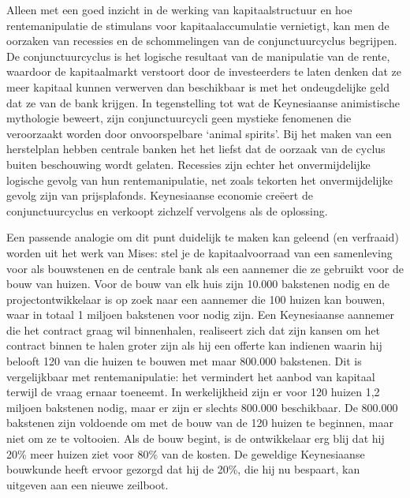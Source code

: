 Alleen met een goed inzicht in de werking van kapitaalstructuur en hoe rentemanipulatie de stimulans voor kapitaalaccumulatie vernietigt, kan men de oorzaken van recessies en de schommelingen van de conjunctuurcyclus begrijpen. De conjunctuurcyclus is het logische resultaat van de manipulatie van de rente, waardoor de kapitaalmarkt verstoort door de investeerders te laten denken dat ze meer kapitaal kunnen verwerven dan beschikbaar is met het ondeugdelijke geld dat ze van de bank krijgen. In tegenstelling tot wat de Keynesiaanse animistische mythologie beweert, zijn conjunctuurcycli geen mystieke fenomenen die veroorzaakt worden door onvoorspelbare `animal spirits'. Bij het maken van een herstelplan hebben centrale banken het het liefst dat de oorzaak van de cyclus buiten beschouwing wordt gelaten. Recessies zijn echter het onvermijdelijke logische gevolg van hun rentemanipulatie, net zoals tekorten het onvermijdelijke gevolg zijn van prijsplafonds. Keynesiaanse economie creëert de conjunctuurcyclus en verkoopt zichzelf vervolgens als de oplossing.

Een passende analogie om dit punt duidelijk te maken kan geleend (en verfraaid) worden uit het werk van Mises: stel je de kapitaalvoorraad van een samenleving voor als bouwstenen en de centrale bank als een aannemer die ze gebruikt voor de bouw van huizen. Voor de bouw van elk huis zijn 10.000 bakstenen nodig en de projectontwikkelaar is op zoek naar een aannemer die 100 huizen kan bouwen, waar in totaal 1 miljoen bakstenen voor nodig zijn. Een Keynesiaanse aannemer die het contract graag wil binnenhalen, realiseert zich dat zijn kansen om het contract binnen te halen groter zijn als hij een offerte kan indienen waarin hij belooft 120 van die huizen te bouwen met maar 800.000 bakstenen. Dit is vergelijkbaar met rentemanipulatie: het vermindert het aanbod van kapitaal terwijl de vraag ernaar toeneemt. In werkelijkheid zijn er voor 120 huizen 1,2 miljoen bakstenen nodig, maar er zijn er slechts 800.000 beschikbaar. De 800.000 bakstenen zijn voldoende om met de bouw van de 120 huizen te beginnen, maar niet om ze te voltooien. Als de bouw begint, is de ontwikkelaar erg blij dat hij 20\% meer huizen ziet voor 80\% van de kosten. De geweldige Keynesiaanse bouwkunde heeft ervoor gezorgd dat hij de 20\%, die hij nu bespaart, kan uitgeven aan een nieuwe zeilboot.

